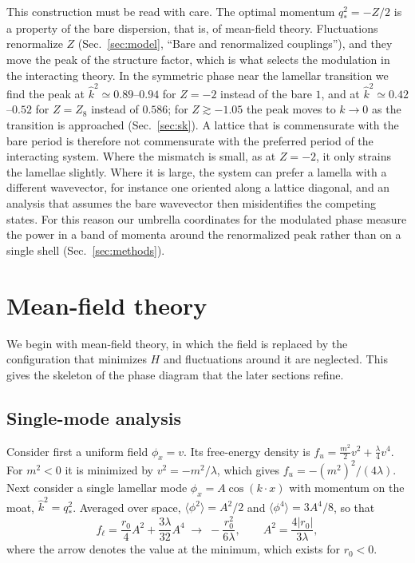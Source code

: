 \documentclass[aps,prd,twocolumn,superscriptaddress,nofootinbib,10pt]{revtex4-2}
\newcommand{\khat}{\widehat{k}^{2}}
\newcommand{\qs}{q_*}
\begin{document}
This construction must be read with care.  The optimal momentum
$\qs^2=-Z/2$ is a property of the bare dispersion, that is, of mean-field
theory.  Fluctuations renormalize $Z$ (Sec.~\ref{sec:model},
``Bare and renormalized couplings''), and they move the peak of the structure
factor, which is what selects the modulation in the interacting theory.  In
the symmetric phase near the lamellar transition we find the peak at
$\khat\simeq0.89$--$0.94$ for $Z=-2$ instead of the bare $1$, and at
$\khat\simeq0.42$--$0.52$ for $Z=Z_8$ instead of $0.586$; for
$Z\gtrsim-1.05$ the peak moves to $k\to0$ as the transition is approached
(Sec.~\ref{sec:sk}).  A lattice that is commensurate with the bare
period is therefore not commensurate with the preferred period of the
interacting system.  Where the mismatch is small, as at $Z=-2$, it only
strains the lamellae slightly.  Where it is large, the system can prefer a
lamella with a different wavevector, for instance one oriented along a
lattice diagonal, and an analysis that assumes the bare wavevector then
misidentifies the competing states.  For this reason our umbrella
coordinates for the modulated phase measure the power in a band of momenta
around the renormalized peak rather than on a single shell
(Sec.~\ref{sec:methods}).

\section{Mean-field theory}
\label{sec:mf}

We begin with mean-field theory, in which the field is replaced by the
configuration that minimizes $H$ and fluctuations around it are neglected.
This gives the skeleton of the phase diagram that the later sections refine.

\subsection{Single-mode analysis}

Consider first a uniform field $\phi_x=v$.  Its free-energy density is
$f_u=\frac{m^2}{2}v^2+\frac{\lambda}{4}v^4$.  For $m^2<0$ it is minimized by
$v^2=-m^2/\lambda$, which gives $f_u=-(m^2)^2/(4\lambda)$.  Next consider a
single lamellar mode $\phi_x=A\cos(k\cdot x)$ with momentum on the moat,
$\khat=\qs^2$.  Averaged over space, $\langle\phi^2\rangle=A^2/2$ and
$\langle\phi^4\rangle=3A^4/8$, so that
\begin{equation}
 f_\ell=\frac{r_0}{4}A^2+\frac{3\lambda}{32}A^4
 \;\to\; -\frac{r_0^2}{6\lambda},\qquad A^2=\frac{4|r_0|}{3\lambda},
 \label{eq:flam}
\end{equation}
where the arrow denotes the value at the minimum, which exists for $r_0<0$.
\end{document}
